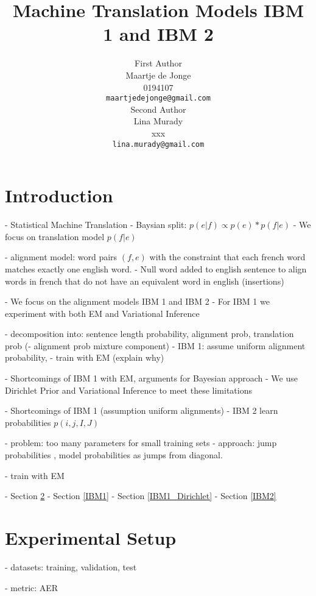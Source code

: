 \documentclass[11pt,a4paper]{article}
\title{Machine Translation Models IBM 1 and IBM 2}
\author{First Author \\
  Maartje de Jonge \\
  0194107 \\
  {\tt maartjedejonge@gmail.com} \\\And
  Second Author \\
  Lina Murady \\
  xxx \\
  {\tt lina.murady@gmail.com} \\}
\date{}
\begin{document}
\maketitle

\begin{abstract}
\end{abstract}

\section{Introduction}

- Statistical Machine Translation
- Baysian split: $p(e|f) \propto p(e)*p(f|e)$ 
- We focus on translation model $p(f|e)$

- alignment model: word pairs $(f,e)$ with the constraint that each french word 
matches exactly one english word. 
- Null word added to english sentence to align words in french that do
not have an equivalent word in english (insertions)

- We focus on the alignment models IBM 1 and IBM 2
- For IBM 1 we experiment with both EM and Variational Inference

- decomposition into: sentence length probability, alignment prob,
translation prob
(- alignment prob mixture component)
- IBM 1: assume uniform alignment probability, 
- train with EM (explain why) 

- Shortcomings of IBM 1 with EM, arguments for Bayesian approach
- We use Dirichlet Prior and Variational Inference to meet these
limitations

- Shortcomings of IBM 1 (assumption uniform alignments)
- IBM 2 learn probabilities  $p(i,j,I,J)$

- problem: too many parameters for small training sets
- approach: jump probabilities \citep{Vogel}, 
model probabilities as jumps from diagonal.

- train with EM

- Section \ref{ExperimentalSetup}
- Section \ref{IBM1}
- Section \ref{IBM1_Dirichlet}
- Section \ref{IBM2}
 
\section{Experimental Setup}
\label{ExperimentalSetup}

- datasets: training, validation, test

- metric: AER
\end{document}
